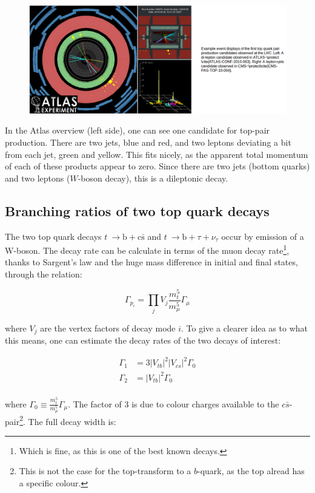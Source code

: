 \documentclass[11pt,a4paper]{article}
\begin{document}
\begin{figure}
	\includegraphics[width=\textwidth]{Overview.png}
\end{figure}

In the Atlas overview (left side), one can see one candidate for top-pair production. There are two jets, blue and red, and two leptons deviating a bit from each jet, green and yellow. This fits nicely, as the apparent total momentum of each of these products appear to zero. Since there are two jets (bottom quarks) and two leptons ($W$-boson decay), this is a dileptonic decay.

\subsection{Branching ratios of two top quark decays}
The two top quark decays $t\:\rightarrow\text{b}+\text{c}\bar{\text{s}}$ and $t\:\rightarrow\text{b}+\tau+\nu_\tau$ occur by emission of a W-boson. The decay rate can be calculate in terms of the muon decay rate\footnote{Which is fine, as this is one of the best known decays.}, thanks to Sargent's law and the huge mass difference in initial and final states, through the relation:

\begin{equation}
	\Gamma_{p_i} = \prod_j V_j \frac{m_t^5}{m_\mu^5}\Gamma_\mu
\end{equation}

where $V_j$ are the vertex factors of decay mode $i$. To give a clearer idea as to what this means, one can estimate the decay rates of the two decays of interest:

\begin{align}
	\Gamma_1 &= 3|V_{tb}|^2|V_{cs}|^2\Gamma_0\\
	\Gamma_2 &= |V_{tb}|^2\Gamma_0\\
\end{align}

where $\Gamma_0 \equiv \frac{m_t^5}{m_\mu^5}\Gamma_\mu$. The factor of 3 is due to colour charges available to the $c\bar{s}$-pair\footnote{This is not the case for the top-transform to a $b$-quark, as the top alread has a specific colour.}. The full decay width is:
\end{document}
